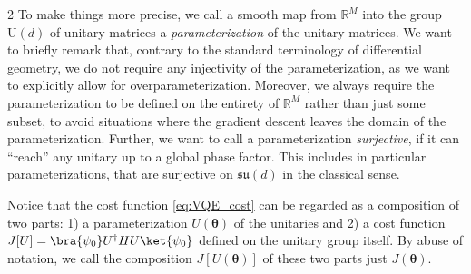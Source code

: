 \documentclass{article}
\renewcommand{\vec}[1]{\ensuremath{\boldsymbol{#1}}}
\begin{document}
\begin{multicols}{2}
To make things more precise, we call a smooth map from \(\mathds{R}^M\) into the group \(\mathrm{U}(d)\) of unitary matrices a \emph{parameterization} of the unitary matrices. We want to briefly remark that, contrary to the standard terminology of differential geometry, we do not require any injectivity of the parameterization, as we want to explicitly allow for overparameterization.
Moreover, we always require the parameterization to be defined on the entirety of \(\mathds{R}^M\) rather than just some subset, to avoid situations where the gradient descent leaves the domain of the parameterization.
Further, we want to call a parameterization \emph{surjective}, if it can ``reach'' any unitary up to a global phase factor.
This includes in particular parameterizations, that are surjective on \(\mathfrak{su}(d)\) in the classical sense.

Notice that the cost function \eqref{eq:VQE_cost} can be regarded as a composition of two parts: 1) a parameterization \(U(\vec{\theta})\) of the unitaries and 2) a cost function \(J[U] = \bra{\psi_0} U^\dagger H U \ket{\psi_0}\) defined on the unitary group itself.
By abuse of notation, we call the composition \(J[U(\vec{\theta})]\) of these two parts just \(J(\vec{\theta})\).


\end{multicols}
\end{document}

